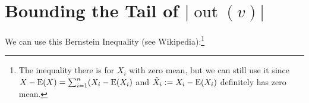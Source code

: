 \documentclass[kpfonts]{patmorin}
\DeclareMathOperator{\outn}{out}
\begin{document}
%
%
%
%
%
%
%







\appendix

\section{Bounding the Tail of \boldmath$|\outn(v)|$}

We can use this Bernstein Inequality (see Wikipedia):\footnote{The inequality there is for $X_i$ with zero mean, but we can still use it since $X-\mathrm{E}(X)=\sum_{i=1}^n (X_i-\mathrm{E}(X_i)$ and $\tilde{X}_i:=X_i-\mathrm{E}(X_i)$ definitely has zero mean.}
\end{document}
